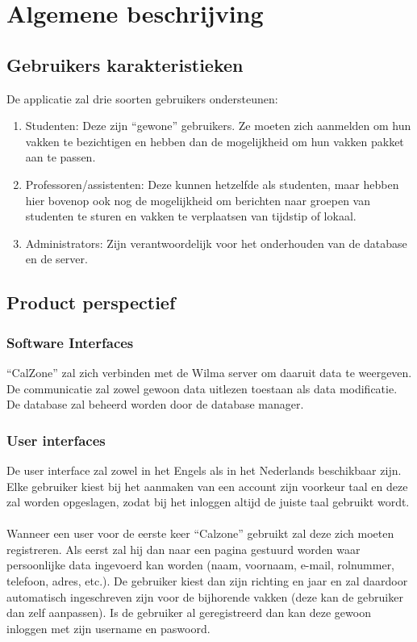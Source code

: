 \chapter{Algemene beschrijving}

\section{Gebruikers karakteristieken}
De applicatie zal drie soorten gebruikers ondersteunen:

\begin{enumerate} 
    \item Studenten: Deze zijn “gewone” gebruikers. 
    Ze moeten zich aanmelden om hun vakken te bezichtigen en hebben dan de mogelijkheid om hun vakken pakket aan te passen.
    \item Professoren/assistenten: Deze kunnen hetzelfde als studenten, maar hebben hier bovenop ook nog de mogelijkheid om berichten naar     groepen van studenten te sturen en vakken te verplaatsen van tijdstip of lokaal.
    \item Administrators: Zijn verantwoordelijk voor het onderhouden van de database en de server.
\end{enumerate}

\section{Product perspectief}

\subsection{Software Interfaces}
“CalZone” zal zich verbinden met de Wilma server om daaruit data te weergeven. 
De communicatie zal zowel gewoon data uitlezen toestaan als data modificatie.
De database zal beheerd worden door de database manager.

\subsection{User interfaces}
De user interface zal zowel in het Engels als in het Nederlands beschikbaar zijn. 
Elke gebruiker kiest bij het aanmaken van een account zijn voorkeur taal en deze zal worden opgeslagen, zodat bij het inloggen altijd de juiste taal gebruikt wordt.
\\
\\
Wanneer een user voor de eerste keer “Calzone” gebruikt zal deze zich moeten registreren. 
Als eerst zal hij dan naar een pagina gestuurd worden waar persoonlijke data ingevoerd kan worden (naam, voornaam, e-mail, rolnummer, telefoon, adres, etc.). 
De gebruiker kiest dan zijn richting en jaar en zal daardoor automatisch ingeschreven zijn voor de bijhorende vakken (deze kan de gebruiker dan zelf aanpassen). 
Is de gebruiker al geregistreerd dan kan deze gewoon inloggen met zijn username en paswoord.  

